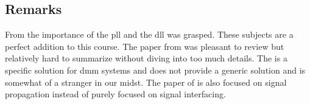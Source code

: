 


\subsection{Remarks}
From \cite{agrawal20098} the importance of the \ac{pll} and the \ac{dll} was grasped. 
These subjects are a perfect addition to this course.
The paper from \cite{agrawal20098} was pleasant to review but relatively hard to summarize without diving into too much details.
The \cite{steenkiste1997high} is a specific solution for \ac{dmm} systems and does not provide a generic solution and is somewhat
of a stranger in our midst.
The paper of \cite{zhang2009high} is also focused on signal propagation instead of purely focused on signal interfacing.
